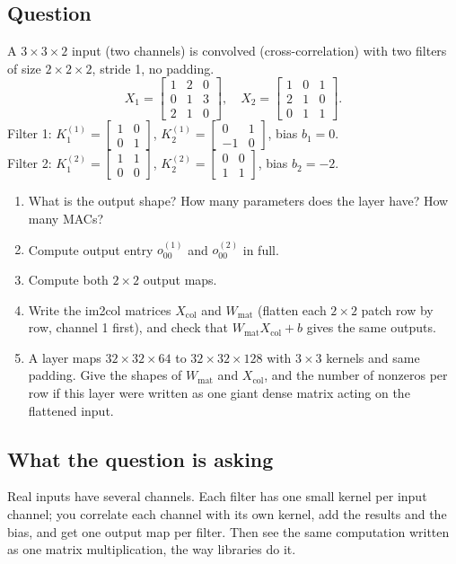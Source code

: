 \documentclass[12pt,a4paper]{article}
\begin{document}
\subsection*{Question}
A $3\times3\times2$ input (two channels) is convolved (cross-correlation) with two filters of size $2\times2\times2$, stride 1, no padding.
\[
X_1=\begin{bmatrix}1&2&0\\0&1&3\\2&1&0\end{bmatrix},\quad X_2=\begin{bmatrix}1&0&1\\2&1&0\\0&1&1\end{bmatrix}.
\]
Filter 1: $K^{(1)}_1=\begin{bmatrix}1&0\\0&1\end{bmatrix}$, $K^{(1)}_2=\begin{bmatrix}0&1\\-1&0\end{bmatrix}$, bias $b_1=0$.\\
Filter 2: $K^{(2)}_1=\begin{bmatrix}1&1\\0&0\end{bmatrix}$, $K^{(2)}_2=\begin{bmatrix}0&0\\1&1\end{bmatrix}$, bias $b_2=-2$.
\begin{enumerate}[label=(\alph*)]
\item What is the output shape? How many parameters does the layer have? How many MACs?
\item Compute output entry $o^{(1)}_{00}$ and $o^{(2)}_{00}$ in full.
\item Compute both $2\times2$ output maps.
\item Write the im2col matrices $X_{\text{col}}$ and $W_{\text{mat}}$ (flatten each $2\times2$ patch row by row, channel 1 first), and check that $W_{\text{mat}}X_{\text{col}}+b$ gives the same outputs.
\item A layer maps $32\times32\times64$ to $32\times32\times128$ with $3\times3$ kernels and same padding. Give the shapes of $W_{\text{mat}}$ and $X_{\text{col}}$, and the number of nonzeros per row if this layer were written as one giant dense matrix acting on the flattened input.
\end{enumerate}

\subsection*{What the question is asking}
Real inputs have several channels. Each filter has one small kernel per input channel; you correlate each channel with its own kernel, add the results and the bias, and get one output map per filter. Then see the same computation written as one matrix multiplication, the way libraries do it.
\end{document}

